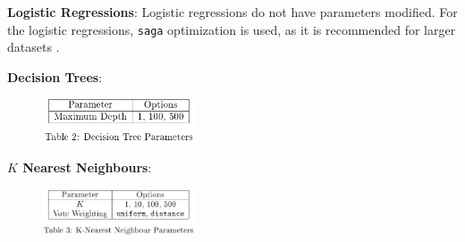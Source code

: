 \documentclass[11pt]{article}
\begin{document}
\textbf{Logistic Regressions}:
Logistic regressions do not have parameters modified.
For the logistic regressions, \texttt{saga} optimization is used, as it is recommended for larger datasets \cite{skl}.

\textbf{Decision Trees}:

\begin{figure}[H]
	\centering
	\includegraphics[width = 0.4\textwidth]{tb dt.png}
	\label{tbl:dt-options}
\end{figure} 

\textbf{$K$ Nearest Neighbours}:

\begin{figure}[H]
	\centering
	\includegraphics[width = 0.4\textwidth]{tb knn.png}
	\label{tbl:knn-options}
\end{figure} 
\end{document}
